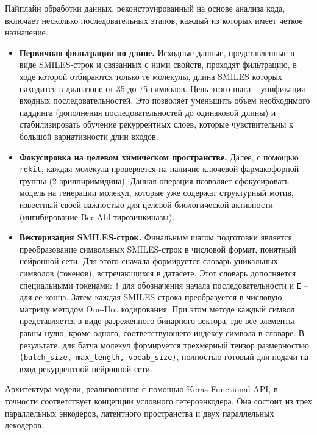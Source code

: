 
Пайплайн обработки данных, реконструированный на основе анализа кода, включает несколько последовательных этапов, каждый из которых имеет четкое назначение.
\begin{itemize}
	\item \textbf{Первичная фильтрация по длине.} Исходные данные, представленные в виде SMILES-строк и связанных с ними свойств, проходят фильтрацию, в ходе которой отбираются только те молекулы, длина SMILES которых находится в диапазоне от 35 до 75 символов. Цель этого шага -- унификация входных последовательностей. Это позволяет уменьшить объем необходимого паддинга (дополнения последовательностей до одинаковой длины) и стабилизировать обучение рекуррентных слоев, которые чувствительны к большой вариативности длин входов.
	\item \textbf{Фокусировка на целевом химическом пространстве.} Далее, с помощью \texttt{rdkit}, каждая молекула проверяется на наличие ключевой фармакофорной группы (2-арилпиримидина). Данная операция позволяет сфокусировать модель на генерации молекул, которые уже содержат структурный мотив, известный своей важностью для целевой биологической активности (ингибирование Bcr-Abl тирозинкиназы).
	\item \textbf{Векторизация SMILES-строк.} Финальным шагом подготовки является преобразование символьных SMILES-строк в числовой формат, понятный нейронной сети. Для этого сначала формируется словарь уникальных символов (токенов), встречающихся в датасете. Этот словарь дополняется специальными токенами: \texttt{!} для обозначения начала последовательности и \texttt{E} -- для ее конца. Затем каждая SMILES-строка преобразуется в числовую матрицу методом One-Hot кодирования. При этом методе каждый символ представляется в виде разреженного бинарного вектора, где все элементы равны нулю, кроме одного, соответствующего индексу символа в словаре. В результате, для батча молекул формируется трехмерный тензор размерностью \texttt{(batch\_size, max\_length, vocab\_size)}, полностью готовый для подачи на вход рекуррентной нейронной сети.
\end{itemize}


Архитектура модели, реализованная с помощью Keras Functional API, в точности соответствует концепции условного гетероэнкодера. Она состоит из трех параллельных энкодеров, латентного пространства и двух параллельных декодеров.

